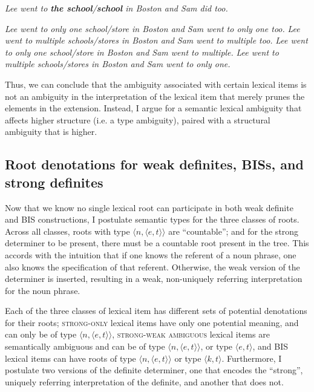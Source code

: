\documentclass[output=paper,
modfonts
]{langscibook}
\begin{document}
\begin{exe}
	\ex \textit{Lee went to \textbf{the school}/\textbf{school} in Boston and Sam did too.}
	\begin{xlist}
	\ex \textit{Lee went to only one school/store in Boston and Sam went to only one too.}
	\ex \textit{Lee went to multiple schools/stores in Boston and Sam went to  multiple too.}
	\ex \textit{Lee went to only one school/store in Boston and Sam went to multiple.} \largerpage[2]
	\ex \textit{Lee went to multiple schools/stores in Boston and Sam went to only one.}
	\end{xlist}
\end{exe}

Thus, we can conclude that the ambiguity associated with certain lexical items is not an ambiguity in the interpretation of the lexical item that merely prunes the elements in the extension. Instead, I argue for a semantic lexical ambiguity that affects higher structure (i.e. a type ambiguity), paired with a structural ambiguity that is higher. 

\subsection{Root denotations for weak definites, BISs, and strong definites}

Now that we know no single lexical root can participate in both weak definite and BIS constructions, I postulate semantic types for the three classes of roots. Across all classes, roots with type $\langle n ,\langle e,t\rangle\rangle$ are ``countable''; and for the strong determiner to be present, there must be a countable root present in the tree. This accords with the intuition that if one knows the referent of a noun phrase, one also knows the  specification of that referent. Otherwise, the weak version of the determiner is inserted, resulting in a weak, non-uniquely referring interpretation for the noun phrase. 

Each of the three classes of lexical item has different sets of potential denotations for their roots; \textsc{strong-only} lexical items have only one potential meaning, and can only be of type $\langle n, \langle e,t \rangle\rangle$, \textsc{strong-weak ambiguous} lexical items are semantically ambiguous and can be of type $\langle n, \langle e,t \rangle\rangle$, or type $\langle e,t \rangle$, and BIS lexical items can have roots of type $\langle n, \langle e,t \rangle\rangle$ or type $\langle k,t \rangle$. Furthermore, I postulate two versions of the definite determiner, one that encodes the ``strong'', uniquely referring interpretation of the definite, and another that does not. 
\end{document}
